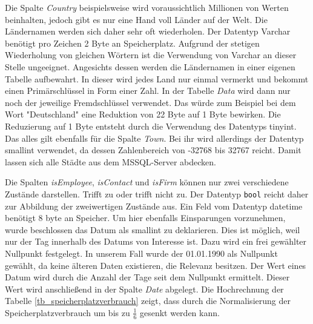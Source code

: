 Die Spalte \textit{Country} beispielsweise wird voraussichtlich Millionen von Werten beinhalten, jedoch gibt es nur eine Hand voll Länder auf der Welt. Die Ländernamen werden sich daher sehr oft wiederholen. Der Datentyp Varchar benötigt pro Zeichen 2 Byte an Speicherplatz. Aufgrund der stetigen Wiederholung von gleichen Wörtern ist die Verwendung von Varchar an dieser Stelle ungeeignet. Angesichts dessen werden die Ländernamen in einer eigenen Tabelle aufbewahrt. In dieser wird jedes Land nur einmal vermerkt und bekommt einen Primärschlüssel in Form einer Zahl. In der Tabelle \textit{Data} wird dann nur noch der jeweilige Fremdschlüssel verwendet. Das würde zum Beispiel bei dem Wort "Deutschland" eine Reduktion von 22 Byte auf 1 Byte bewirken. Die Reduzierung auf 1 Byte entsteht durch die Verwendung des Datentyps tinyint. Das alles gilt ebenfalls für die Spalte \textit{Town}. Bei ihr wird allerdings der Datentyp smallint verwendet, da dessen Zahlenbereich von -32768 bis 32767 reicht. Damit lassen sich alle Städte aus dem MSSQL-Server abdecken. 

Die Spalten \textit{isEmployee}, \textit{isContact} und \textit{isFirm} können nur zwei verschiedene Zustände darstellen. Trifft zu oder trifft nicht zu. Der Datentyp \texttt{bool} reicht daher zur Abbildung der zweiwertigen Zustände aus. Ein Feld vom Datentyp datetime benötigt 8 byte an Speicher. Um hier ebenfalls Einsparungen vorzunehmen, wurde beschlossen das Datum als smallint zu deklarieren. Dies ist möglich, weil nur der Tag innerhalb des Datums von Interesse ist. Dazu wird ein frei gewählter Nullpunkt festgelegt. In unserem Fall wurde der 01.01.1990 als Nullpunkt gewählt, da keine älteren Daten existieren, die Relevanz besitzen. Der Wert eines Datum wird durch die Anzahl der Tage seit dem Nullpunkt ermittelt. Dieser Wert wird anschließend in der Spalte \textit{Date} abgelegt. Die Hochrechnung der Tabelle \ref{tb_speicherplatzverbrauch} zeigt, dass durch die Normalisierung der Speicherplatzverbrauch um bis zu $ \frac{1}{6} $ gesenkt werden kann.

